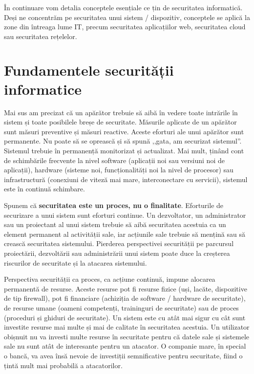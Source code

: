 În continuare vom detalia conceptele esențiale ce țin de securitatea informatică. Deși ne concentrăm pe securitatea unui sistem / dispozitiv, conceptele se aplică la zone din întreaga lume IT, precum securitatea aplicațiilor web, securitatea cloud sau securitatea rețelelor.

\section{Fundamentele securității informatice}
\label{sec:sec:fundamentals}

Mai sus am precizat că un apărător trebuie să aibă în vedere toate intrările în sistem și toate posibilele breșe de securitate. Măsurile aplicate de un apărător sunt măsuri preventive și măsuri reactive. Aceste eforturi ale unui apărător sunt permanente. Nu poate să se oprească și să spună ,,gata, am securizat sistemul''. Sistemul trebuie în permanență monitorizat și actualizat. Mai mult, ținând cont de schimbările frecvente la nivel software (aplicații noi sau versiuni noi de aplicații), hardware (sisteme noi, funcționalități noi la nivel de procesor) sau infrastructură (conexiuni de viteză mai mare, interconectare cu servicii), sistemul este în continuă schimbare.

Spunem că \textbf{securitatea este un proces, nu o finalitate}. Eforturile de securizare a unui sistem sunt eforturi continue. Un dezvoltator, un administrator sau un proiectant al unui sistem trebuie să aibă securitatea acestuia ca un element permanent al activității sale, iar acțiunile sale trebuie să mențină sau să crească securitatea sistemului. Pierderea perspectivei securității pe parcursul proiectării, dezvoltării sau administrării unui sistem poate duce la creșterea riscurilor de securitate și la atacarea sistemului.

Perspectiva securității ca proces, ca acțiune continuă, impune alocarea permanentă de resurse. Aceste resurse pot fi resurse fizice (uși, lacăte, dispozitive de tip firewall), pot fi financiare (achiziția de software / hardware de securitate), de resurse umane (oameni competenți, traininguri de securitate) sau de proces (proceduri și ghiduri de securitate). Un sistem este cu atât mai sigur cu cât sunt investite resurse mai multe și mai de calitate în securitatea acestuia. Un utilizator obișnuit nu va investi multe resurse în securitate pentru că datele sale și sistemele sale nu sunt atât de interesante pentru un atacator. O companie mare, în special o bancă, va avea însă nevoie de investiții semnificative pentru securitate, fiind o țintă mult mai probabilă a atacatorilor.

